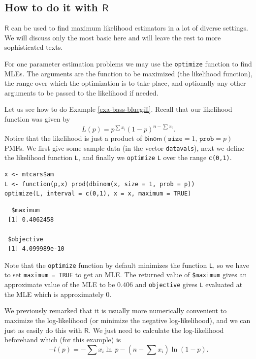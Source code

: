 \documentclass[captions=tableheading]{scrbook}
\begin{document}
\subsection{How to do it with \(\mathsf{R}\)}
\label{sec-9-1-1}


\(\mathsf{R}\) can be used to find maximum likelihood estimators in a lot of diverse settings. We will discuss only the most basic here and will leave the rest to more sophisticated texts.

For one parameter estimation problems we may use the \texttt{optimize} function to find MLEs. The arguments are the function to be maximized (the likelihood function), the range over which the optimization is to take place, and optionally any other arguments to be passed to the likelihood if needed.

Let us see how to do Example \ref{exa-bass-bluegill}. Recall that our likelihood function was given by
\begin{equation}
L(p)=p^{\sum x_{i}}(1-p)^{n-\sum x_{i}}.
\end{equation}
Notice that the likelihood is just a product of \(\mathsf{binom}(\mathtt{size}=1,\,\mathtt{prob}=p)\) PMFs. We first give some sample data (in the vector \texttt{datavals}), next we define the likelihood function \texttt{L}, and finally we \texttt{optimize} \texttt{L} over the range \texttt{c(0,1)}.


\begin{verbatim}
x <- mtcars$am
L <- function(p,x) prod(dbinom(x, size = 1, prob = p))
optimize(L, interval = c(0,1), x = x, maximum = TRUE)
\end{verbatim}

\begin{verbatim}
  $maximum
 [1] 0.4062458
 
 $objective
 [1] 4.099989e-10
\end{verbatim}



Note that the \texttt{optimize} function by default minimizes the function \texttt{L}, so we have to set \texttt{maximum = TRUE} to get an MLE. The returned value of \texttt{\$maximum} gives an approximate value of the MLE to be \(  0.406 \) and \texttt{objective} gives \texttt{L} evaluated at the MLE which is approximately \(  0 \).

We previously remarked that it is usually more numerically convenient to maximize the log-likelihood (or minimize the negative log-likelihood), and we can just as easily do this with \(\mathsf{R}\). We just need to calculate the log-likelihood beforehand which (for this example) is
\[
-l(p)=-\sum x_{i}\ln\, p-\left(n-\sum x_{i}\right)\ln(1-p).
\]
\end{document}

